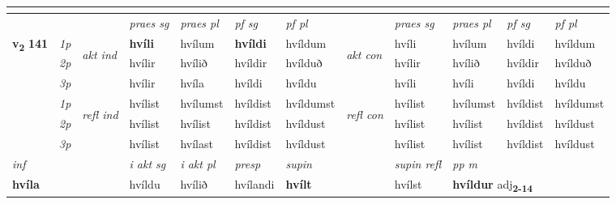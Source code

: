 \begin{longtable}[l]{X>{\footnotesize\itshape}llXXXXlXXXX}
  & \\
   \midrule
 & &   & \textit{praes sg}  & \textit{praes pl}    & \textit{ pf sg} & \textit{pf pl} & & \textit{praes sg}  & \textit{praes pl}    & \textit{pf sg} & \textit{pf pl }  \\ \cmidrule{4-7} \cmidrule{9-12}
 \multirow{2}{*}{{{\textbf{v{\textsubscript{2}}} \Large{\textbf{141}}}}}  & 1p & \multirow{3}{*}{\begin{turn}{90}\textit{akt ind}\end{turn}} & \textbf{hvíli} & hvílum & \textbf{hvíldi} & hvíldum & \multirow{3}{*}{\begin{turn}{90}\textit{akt con}\end{turn}} &hvíli & hvílum & hvíldi & hvíldum\\*
 & 2p &  &  hvílir  & hvílið & hvíldir & hvílduð & & hvílir & hvílið & hvíldir & hvílduð \\*
 & 3p &  & hvílir & hvíla & hvíldi & hvíldu & & hvíli & hvíli& hvíldi & hvíldu \\*
\cmidrule{4-7} \cmidrule{9-12}
 & 1p & \multirow{3}{*}{\begin{turn}{90}\textit{refl ind}\end{turn}}  & hvílist & hvílumst & hvíldist & hvíldumst & \multirow{3}{*}{\begin{turn}{90}\textit{refl con}\end{turn}}  &hvílist & hvílumst & hvíldist & hvíldumst \\*
 & 2p &  & hvílist & hvílist & hvíldist & hvíldust & &hvílist & hvílist & hvíldist & hvíldust \\*
 & 3p  & & hvílist & hvílast & hvíldist & hvíldust & & hvílist & hvílist& hvíldist & hvíldust \\*
\cmidrule{4-7} \cmidrule{9-12}

   {\textit{inf}} & &  & \textit{i akt sg} & \textit{i akt pl}   & \textit{presp} & \textit{supin} && \textit{supin refl} & \textit{pp m} \\*
  {\textbf{hvíla}} & && hvíldu  & hvílið   & hvílandi &  \textbf{hvílt} && hvílst & \multicolumn{2}{l}{\textbf{hvíldur} adj\textbf{\textsubscript{2-14}}} \\*

\midrule


\end{longtable}
